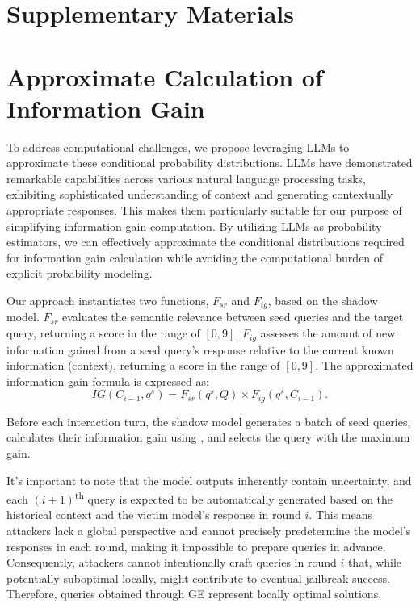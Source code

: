 \appendix
{}
\section*{Supplementary Materials}


\section{Approximate Calculation of Information Gain}\label{sec:details}
To address computational challenges, we propose leveraging LLMs to approximate these conditional probability distributions. LLMs have demonstrated remarkable capabilities across various natural language processing tasks, exhibiting sophisticated understanding of context and generating contextually appropriate responses. This makes them particularly suitable for our purpose of simplifying information gain computation. By utilizing LLMs as probability estimators, we can effectively approximate the conditional distributions required for information gain calculation while avoiding the computational burden of explicit probability modeling.

Our approach instantiates two functions, $F_{sr}$ and $F_{ig}$, based on the shadow model. $F_{sr}$ evaluates the semantic relevance between seed queries and the target query, returning a score in the range of $[0,9]$. $F_{ig}$ assesses the amount of new information gained from a seed query's response relative to the current known information (context), returning a score in the range of $[0,9]$. The approximated information gain formula is expressed as:
\begin{equation}\label{e:ig}
    IG(C_{i-1},q^s) = F_{sr}(q^s,Q) \times F_{ig}(q^s,C_{i-1}).
\end{equation} 

Before each interaction turn, the shadow model generates a batch of seed queries, calculates their information gain using , and selects the query with the maximum gain.

It's important to note that the model outputs inherently contain uncertainty, and each $(i+1)$\textsuperscript{th} query is expected to be automatically generated based on the historical context and the victim model's response in round $i$. This means attackers lack a global perspective and cannot precisely predetermine the model's responses in each round, making it impossible to prepare queries in advance. Consequently, attackers cannot intentionally craft queries in round $i$ that, while potentially suboptimal locally, might contribute to eventual jailbreak success. Therefore, queries obtained through GE represent locally optimal solutions. 


